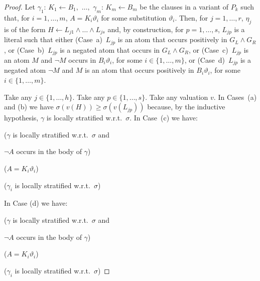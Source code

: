 \documentclass[english]{tlp}
\begin{document}
\begin{proof}
Let $\gamma_1$: $K_{1}\leftarrow B_{1},$ $\ldots ,$ $\gamma_m$:
$K_{m}\leftarrow B_{m}$ be the clauses in a variant of \( P_{k} \)
such that, for \( i=1,\ldots ,m \), \(A\! =\! K_{i}\vartheta_i\) for
some substitution $\vartheta_i$. Then,  for \( j=1,\ldots ,r \), \(
\eta _{j} \) is of the form \( H\leftarrow L_{j1}\wedge\ldots\wedge
L_{js}\) and, by construction, for $p=1,\ldots,s$, $L_{jp}$ is a
literal such that either (Case~a)~$L_{jp}$ is an atom that occurs
positively in $G_L\wedge G_R$, or (Case~b)~$L_{jp}$ is a negated
atom that occurs in $G_L\wedge G_R$, or (Case~c)~$L_{jp}$ is an atom
$M$ and $\neg M$ occurs in $B_i\vartheta_i$, for some $i\in
\{1,\ldots ,m\} $, or (Case~d)~$L_{jp}$ is a negated atom $\neg M$
and $M$ is an atom that occurs positively in $B_i\vartheta_i$, for
some $i\in \{1,\ldots ,m\} $.

Take any $j\in\{1,\ldots,h\}$.
Take any $p\in\{1,\ldots,s\}$. Take any valuation $v$. In Cases~(a) and (b) we have
$\sigma(v(H))\geq \sigma(v(L_{jp}))$ because, by the inductive
hypothesis, $\gamma$ is locally stratified w.r.t.~$\sigma$. 
In Case~(c) we have:

\smallskip

  ($\gamma$ is locally stratified w.r.t.~$\sigma$ and

\makebox[48mm][l]{}
$\neg A$ occurs in the body of $\gamma$)

\hspace*{1.4cm} 
($A=K_i\vartheta_i$)

\hspace*{1.4cm}  ($\gamma_i$
is locally stratified w.r.t.~$\sigma$)

\smallskip

\noindent In Case (d) we have:
\smallskip

  ($\gamma$ is locally stratified
w.r.t.~$\sigma$ and 

\makebox[48mm][l]{}
$\neg A$ occurs in the body of $\gamma$)

\hspace*{1.4cm} 
($A=K_i\vartheta_i$)

\hspace*{1.4cm} 
($\gamma_i$ is locally stratified w.r.t.~$\sigma$)


\end{proof}
\end{document}
